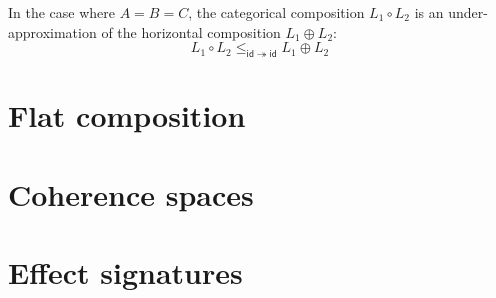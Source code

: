 \documentclass{article}
\begin{document}
In the case where $A = B = C$,
the categorical composition $L_1 \circ L_2$
is an under-approximation of
the horizontal composition $L_1 \oplus L_2$:
\[
    L_1 \circ L_2
    \le_{\mathsf{id} \twoheadrightarrow \mathsf{id}}
    L_1 \oplus L_2
\]




\section{Flat composition}

\section{Coherence spaces}

\section{Effect signatures}
\end{document}
